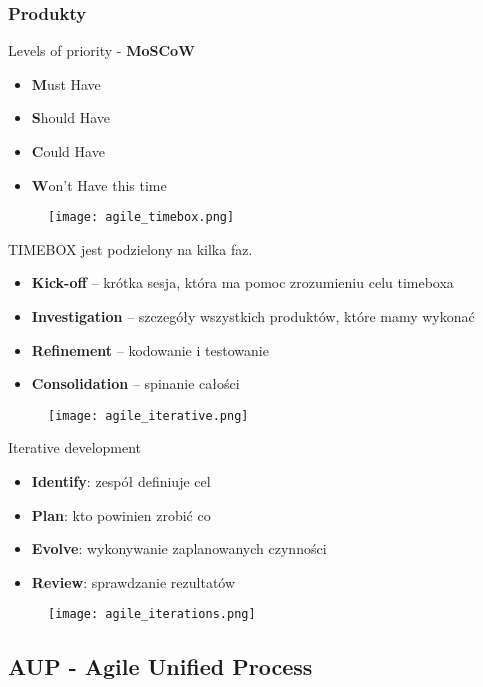 \documentclass[a4paper]{article}
\begin{document}
\subsubsection{Produkty}

Levels of priority - \textbf{MoSCoW}
    \begin{itemize}
        \item \textbf{M}ust Have
        \item \textbf{S}hould Have
        \item \textbf{C}ould Have
        \item \textbf{W}on’t Have this time
    \end{itemize}

\begin{figure}[!h]
    \texttt{[image: agile\_timebox.png]}
\end{figure}
TIMEBOX jest podzielony na kilka faz.
    \begin{itemize}
        \item \textbf{Kick-off} – krótka sesja, która ma pomoc zrozumieniu celu timeboxa
        \item \textbf{Investigation} – szczegóły wszystkich produktów, które mamy wykonać
        \item \textbf{Refinement} – kodowanie i testowanie
        \item \textbf{Consolidation} – spinanie całości
    \end{itemize}


\begin{figure}[!h]
    \texttt{[image: agile\_iterative.png]}
\end{figure}
Iterative development
\begin{itemize}
    \item \textbf{Identify}: zespół definiuje cel
    \item \textbf{Plan}: kto powinien zrobić co
    \item \textbf{Evolve}: wykonywanie
zaplanowanych czynności
    \item \textbf{Review}: sprawdzanie rezultatów
\end{itemize}


\begin{figure}[!h]
    \texttt{[image: agile\_iterations.png]}
\end{figure}


\subsection{AUP - Agile Unified Process}
\end{document}
